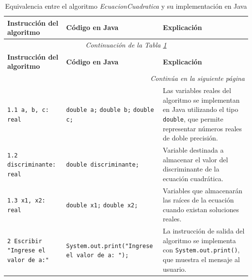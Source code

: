 \documentclass[12pt,twoside]{book}
\begin{document}
					\begin{landscape}
						
						\begin{longtable}{p{6cm} p{6cm} p{7.5cm}}
							
							\caption{Equivalencia entre el algoritmo \textit{EcuacionCuadratica} y su implementación en Java}
							\label{tab:eqCuadraticaEquivalencia} \\
							
							\toprule
							\textbf{Instrucción del algoritmo} & \textbf{Código en Java} & \textbf{Explicación} \\
							\midrule
							\endfirsthead
							
							
							\multicolumn{3}{c}{\textit{Continuación de la Tabla \ref{tab:eqCuadraticaEquivalencia}}} \\
							\toprule
							\textbf{Instrucción del algoritmo} & \textbf{Código en Java} & \textbf{Explicación} \\
							\midrule
							\endhead
							
							
							\midrule
							\multicolumn{3}{r}{\textit{Continúa en la siguiente página}} \\
							\endfoot
							
							
							\bottomrule
							\endlastfoot
							
							
							
							\texttt{1.1 a, b, c: real}
							&
							\texttt{double a;} \newline
							\texttt{double b;} \newline
							\texttt{double c;}
							&
							Las variables reales del algoritmo se implementan en Java utilizando el tipo \texttt{double}, que permite representar números reales de doble precisión. \\
							
							
							\texttt{1.2 discriminante: real}
							&
							\texttt{double discriminante;}
							&
							Variable destinada a almacenar el valor del discriminante de la ecuación cuadrática. \\
							
							
							\texttt{1.3 x1, x2: real}
							&
							\texttt{double x1;} \newline
							\texttt{double x2;}
							&
							Variables que almacenarán las raíces de la ecuación cuando existan soluciones reales. \\
							
							
							\texttt{2 Escribir "Ingrese el valor de a:"}
							&
							\texttt{System.out.print("Ingrese el valor de a: ");}
							&
							La instrucción de salida del algoritmo se implementa con \texttt{System.out.print()}, que muestra el mensaje al usuario. \\
							

\end{longtable}
\end{landscape}
\end{document}

